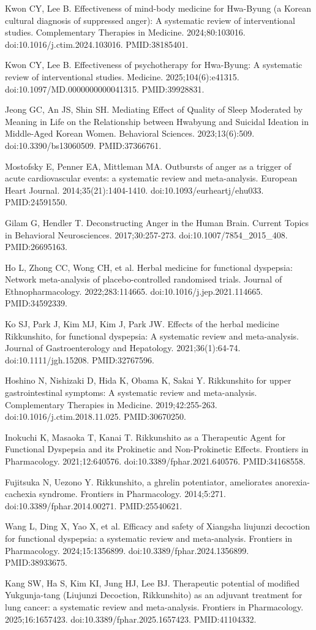 \documentclass[11pt,oneside]{book}
\newcommand{\reff}[2]{\par\hangindent=7mm\hangafter=1\noindent[#1]\hspace{2mm}#2\par}
\begin{document}
\reff{22}{Kwon CY, Lee B. Effectiveness of mind-body medicine for Hwa-Byung (a Korean cultural diagnosis of suppressed anger): A systematic review of interventional studies. Complementary Therapies in Medicine. 2024;80:103016. doi:10.1016/j.ctim.2024.103016. PMID:38185401.}
\reff{23}{Kwon CY, Lee B. Effectiveness of psychotherapy for Hwa-Byung: A systematic review of interventional studies. Medicine. 2025;104(6):e41315. doi:10.1097/MD.0000000000041315. PMID:39928831.}
\reff{24}{Jeong GC, An JS, Shin SH. Mediating Effect of Quality of Sleep Moderated by Meaning in Life on the Relationship between Hwabyung and Suicidal Ideation in Middle-Aged Korean Women. Behavioral Sciences. 2023;13(6):509. doi:10.3390/bs13060509. PMID:37366761.}
\reff{25}{Mostofsky E, Penner EA, Mittleman MA. Outbursts of anger as a trigger of acute cardiovascular events: a systematic review and meta-analysis. European Heart Journal. 2014;35(21):1404-1410. doi:10.1093/eurheartj/ehu033. PMID:24591550.}
\reff{26}{Gilam G, Hendler T. Deconstructing Anger in the Human Brain. Current Topics in Behavioral Neurosciences. 2017;30:257-273. doi:10.1007/7854\_2015\_408. PMID:26695163.}
\reff{27}{Ho L, Zhong CC, Wong CH, et al. Herbal medicine for functional dyspepsia: Network meta-analysis of placebo-controlled randomised trials. Journal of Ethnopharmacology. 2022;283:114665. doi:10.1016/j.jep.2021.114665. PMID:34592339.}
\reff{28}{Ko SJ, Park J, Kim MJ, Kim J, Park JW. Effects of the herbal medicine Rikkunshito, for functional dyspepsia: A systematic review and meta-analysis. Journal of Gastroenterology and Hepatology. 2021;36(1):64-74. doi:10.1111/jgh.15208. PMID:32767596.}
\reff{29}{Hoshino N, Nishizaki D, Hida K, Obama K, Sakai Y. Rikkunshito for upper gastrointestinal symptoms: A systematic review and meta-analysis. Complementary Therapies in Medicine. 2019;42:255-263. doi:10.1016/j.ctim.2018.11.025. PMID:30670250.}
\reff{30}{Inokuchi K, Masaoka T, Kanai T. Rikkunshito as a Therapeutic Agent for Functional Dyspepsia and its Prokinetic and Non-Prokinetic Effects. Frontiers in Pharmacology. 2021;12:640576. doi:10.3389/fphar.2021.640576. PMID:34168558.}
\reff{31}{Fujitsuka N, Uezono Y. Rikkunshito, a ghrelin potentiator, ameliorates anorexia-cachexia syndrome. Frontiers in Pharmacology. 2014;5:271. doi:10.3389/fphar.2014.00271. PMID:25540621.}
\reff{32}{Wang L, Ding X, Yao X, et al. Efficacy and safety of Xiangsha liujunzi decoction for functional dyspepsia: a systematic review and meta-analysis. Frontiers in Pharmacology. 2024;15:1356899. doi:10.3389/fphar.2024.1356899. PMID:38933675.}
\reff{33}{Kang SW, Ha S, Kim KI, Jung HJ, Lee BJ. Therapeutic potential of modified Yukgunja-tang (Liujunzi Decoction, Rikkunshito) as an adjuvant treatment for lung cancer: a systematic review and meta-analysis. Frontiers in Pharmacology. 2025;16:1657423. doi:10.3389/fphar.2025.1657423. PMID:41104332.}
\end{document}
